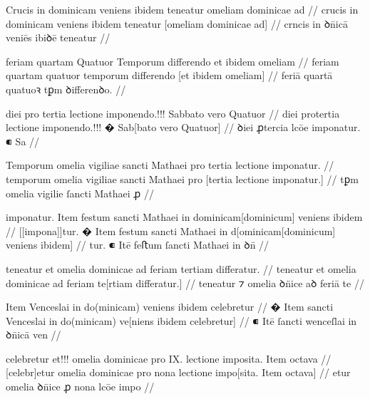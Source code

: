 \ex \bg
\gla
{}
Crucis in dominicam veniens ibidem
teneatur omeliam dominicae ad 
//
\glRekonstrukcja
{}
crucis in dominicam veniens ibidem
teneatur [omeliam dominicae ad]
//
\glU
{}
crncis in ꝺn̄icā veniēs ibiꝺē teneatur    
//
\endgl
\xe



\ex \bg
\gla
{}
feriam quartam Quatuor Temporum
differendo et ibidem omeliam 
//
\glRekonstrukcja
{}
feriam quartam quatuor temporum
differendo [et ibidem omeliam] 
//
\glU
{}
feriā quartā quatuoꝛ tꝑm ꝺiﬀerenꝺo.   
//
\endgl
\xe



\ex \bg
\gla
{}
diei pro tertia lectione imponendo.!!! 
{} Sabbato vero Quatuor 
//
\glRekonstrukcja
{}
diei protertia lectione {} imponendo.!!!
� Sab[bato vero Quatuor]
//
\glU
{}
ꝺiei ꝓtercia lcōe {} imponatur. ⁌ Sa
//
\endgl
\xe



\ex \bg
\gla
{} Temporum omelia vigiliae sancti Mathaei
pro tertia lectione imponatur.
//
\glRekonstrukcja
{} temporum omelia vigiliae sancti Mathaei
pro [tertia lectione imponatur.]
//
\glU
{}
tꝑm omelia vigilie ſancti Mathaei ꝓ   
//
\endgl
\xe



\ex \bg
\gla
{}
imponatur.
{} Item festum sancti Mathaei in dominicam[dominicum] veniens ibidem
//
\glRekonstrukcja
{}
[[impona]]tur.
� Item festum sancti Mathaei in d[ominicam[dominicum] veniens ibidem]
//
\glU
{}
tur. ⁌ Itē feﬅum ſancti Mathaei in ꝺn̄  
//
\endgl
\xe



\ex \bg
\gla
{}
teneatur et omelia dominicae ad feriam tertiam differatur.
//
\glRekonstrukcja
{}
teneatur et omelia dominicae ad feriam te[rtiam differatur.]
//
\glU
{}
teneatur ⁊ omelia ꝺn̈ice aꝺ feriā te 
//
\endgl
\xe



\ex \bg
\gla
{}
{} Item {} Venceslai in do(minicam) veniens ibidem celebretur
//
\glRekonstrukcja
{}
� Item sancti Venceslai in do(minicam) ve[niens ibidem celebretur]
//
\glU
{}
⁌ Itē ſancti wenceſlai in ꝺn̄icā ven
//
\endgl
\xe



\ex \bg
\gla
{}
celebretur et!!! omelia
dominicae pro IX. {} lectione imposita. Item octava
//
\glRekonstrukcja
{}
[celebr]etur {} omelia
dominicae pro {} nona lectione impo[sita. Item octava]
//
\glU
{}
etur {} omelia ꝺn̄ice ꝓ {} nona lcōe impo  
//
\endgl
\xe



